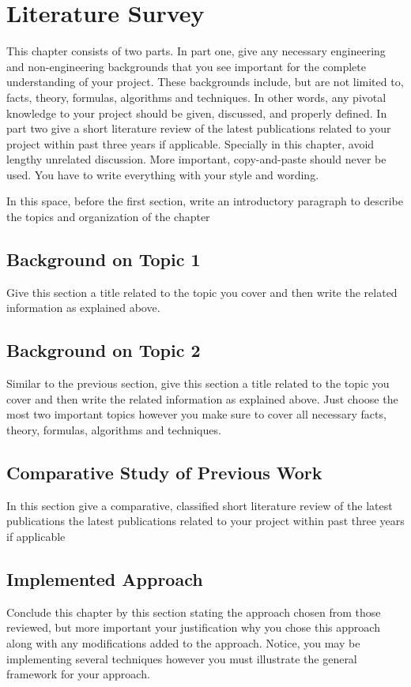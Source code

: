 \chapter{Literature Survey}

This chapter consists of two parts.  In part one, give any necessary engineering and non-engineering backgrounds that you see important for the complete understanding of your project. These backgrounds include, but are not limited to, facts, theory, formulas, algorithms and techniques. In other words, any pivotal knowledge to your project should be given, discussed, and properly defined. In part two give a short literature review of the latest publications related to your project within past three years if applicable.  Specially in this chapter, avoid lengthy unrelated discussion. More important, copy-and-paste should never be used. You have to write everything with your style and wording.

In this space, before the first section, write an introductory paragraph to describe the topics and organization of the chapter

\section{Background on Topic 1}
Give this section a title related to the topic you cover and  then write the related information as explained above. 

\section{Background on Topic 2}
Similar to the previous section, give this section a title related to the topic you cover and  then write the related information as explained above. 
Just choose the most two important topics however you make sure to cover all necessary facts, theory, formulas, algorithms and techniques.

\section{Comparative Study of Previous Work}
In this section give a comparative, classified  short literature review of the latest publications the latest publications related to your project within past three years if applicable

\section{Implemented Approach}
Conclude this chapter by this section stating the approach chosen from those reviewed, but more important your justification why you chose this approach along with any modifications added to the approach.
Notice, you may be implementing several techniques however you must illustrate the general framework for your approach.
